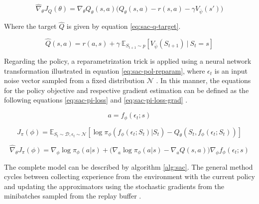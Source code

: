 \begin{equation} \label{eq:sac-q-loss-grad}
\hat{\nabla}_\theta J_Q (\theta) = \nabla_\theta Q_\theta (s, a) \Big( Q_\theta (s, a) - r(s, a) - \gamma V_{\overline{\psi}} (s') \Big)
\end{equation}

Where the target $\hat{Q}$ is given by equation \ref{eq:sac-q-target}. \par

\begin{equation} \label{eq:sac-q-target}
\hat{Q} (s, a) = r(a,s) + \gamma\ \mathbb{E}_{S_{t+1} \sim p} [V_{\overline{\psi}} (S_{t+1})\ |\ S_t=s]
\end{equation}

Regarding the policy, a reparametrization trick is applied using a neural network transformation illustrated in equation \ref{eq:sac-pol-reparam}, where $\epsilon_t$ is an input noise vector sampled from a fixed distribution $\mathcal{N}$ \cite{openaiSpinningDocumentation, haarnojaSoftActorCriticOffPolicy2018}. In this manner, the equations for the policy objective and respective gradient estimation can be defined as the following equations \ref{eq:sac-pi-loss} and \ref{eq:sac-pi-loss-grad} \cite{openaiSpinningDocumentation, haarnojaSoftActorCriticOffPolicy2018}.

\begin{equation} \label{eq:sac-pol-reparam}
	a = f_\phi (\epsilon_t; s)
\end{equation}

\begin{equation} \label{eq:sac-pi-loss}
	J_\pi (\phi) = \mathbb{E}_{S_t \sim \mathcal{D}, \epsilon_t \sim \mathcal{N}} \left[ \log \pi_\phi (f_\phi (\epsilon_t; S_t)| S_t) - Q_\theta (S_t, f_\phi(\epsilon_t; S_t)) \right]
\end{equation}

\begin{equation} \label{eq:sac-pi-loss-grad}
	\hat{\nabla}_\theta J_\pi (\phi) = \nabla_\phi \log \pi_\phi (a | s) + \Big( \nabla_{a}  \log \pi_\phi (a|s) - \nabla_{a} Q (s, a)) \nabla_\phi f_\phi (\epsilon_t; s)
\end{equation}

The complete model can be described by algorithm \ref{alg:sac}. The general method cycles between collecting experience from the environment with the current policy and updating the approximators using the stochastic gradients from the minibatches sampled from the replay buffer \cite{haarnojaSoftActorCriticOffPolicy2018}. \par

